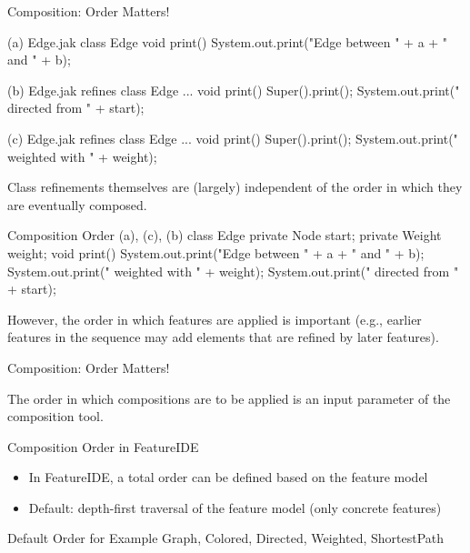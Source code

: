 \begin{frame}[fragile]{Composition: Order Matters!}
	\small
	\begin{fancycolumns}[animation=none]
\begin{codetight}[style=footnotesize]{(a) Edge.jak}
class Edge {
	void print() {
		System.out.print("Edge between " + a + " and " + b);
	}
}
\end{codetight}
\begin{codetight}[style=footnotesize]{(b) Edge.jak}
refines class Edge { ...
	void print() {
		Super().print();
		System.out.print(" directed from " + start);
	}
}
\end{codetight}
\begin{codetight}[style=footnotesize]{(c) Edge.jak}
refines class Edge { ...
	void print() {
		Super().print();
		System.out.print(" weighted with " + weight);
	}
}
\end{codetight}
	\nextcolumn
		\begin{note}{}
			Class refinements themselves are (largely) independent of the order in which they are eventually composed.
		\end{note}
\begin{codetight}[style=footnotesize]{Composition Order (a), (c), (b)}
class Edge {
	private Node start;
	private Weight weight;
	void print() {
		System.out.print("Edge between " + a + " and " + b);
		System.out.print(" weighted with " + weight);
		System.out.print(" directed from " + start);
	}
}
\end{codetight}
		\begin{note}{}
			However, the order in which features are applied is important 
			(e.g., earlier features in the sequence may add elements that are refined by later features). 
		\end{note}
	\end{fancycolumns}
\end{frame}

\begin{frame}{Composition: Order Matters!}
	\begin{fancycolumns}[b]
		\begin{note}{}
			The order in which compositions are to be applied is an input parameter of the composition tool.
		\end{note}
		\begin{note}{Composition Order in FeatureIDE}
			\begin{itemize}
				\item In FeatureIDE, a total order can be defined based on the feature model
				\item Default: depth-first traversal of the feature model (only concrete features)
			\end{itemize}
		\end{note}
	\nextcolumn
		\centering\featureDiagramGraphs
		\begin{example}{Default Order for Example}
			Graph, Colored, Directed, Weighted, ShortestPath
		\end{example}
	\end{fancycolumns}
\end{frame}

